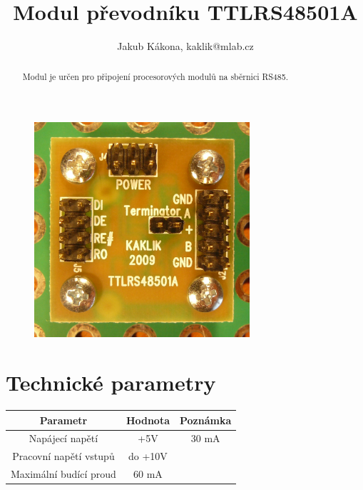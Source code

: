 \documentclass[12pt,a4paper,twoside]{article}
\begin{document}
\title{Modul převodníku TTLRS48501A}
\author{Jakub Kákona, kaklik@mlab.cz}
\maketitle

\thispagestyle{empty}
\begin{abstract}
Modul je určen pro připojení procesorových modulů na sběrnici RS485.
\end{abstract}

\begin{figure} [htbp]
\begin{center}
\includegraphics [width=80mm] {TTLRS48501A_Top_Big.JPG} 
\end{center}
\end{figure}

\tableofcontents


\section{Technické parametry}
\begin{table}[htbp]
\begin{center}
\begin{tabular}{|c|c|c|}
\hline
\multicolumn{1}{|c|}{Parametr} & \multicolumn{1}{|c|}{Hodnota} & \multicolumn{1}{|c|}{Poznámka} \\ \hline
Napájecí napětí & +5V &  30 mA \\ \hline
Pracovní napětí  vstupů & do +10V &  \\ \hline
Maximální budící proud  & 60 mA & \\ \hline
\end{tabular}
\end{center}
\end{table}
\end{document}
